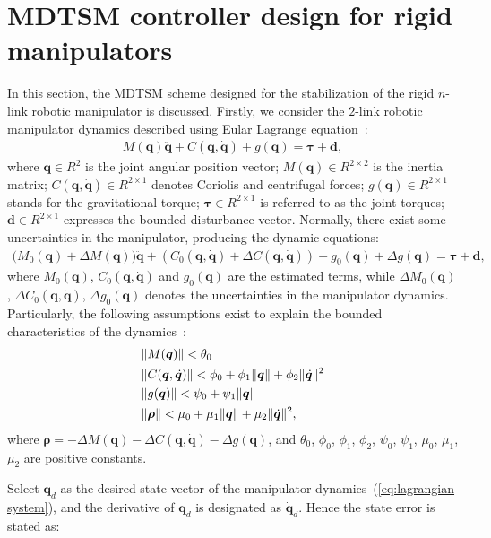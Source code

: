 \documentclass[3p]{elsarticle}
\theoremstyle{plain}
\theoremstyle{remark}
\begin{document}
\section{MDTSM controller design for rigid manipulators}\label{sec:3}
In this section, the MDTSM scheme designed for the stabilization of the rigid $n$-link robotic manipulator is discussed. Firstly, we consider the $2$-link robotic manipulator dynamics described using Eular Lagrange equation~\cite{feng2002non}:
\begin{align}
M(\bm q)\ddot {\bm q}+C(\bm q,\dot {\bm q})+g(\bm q)= \bm\tau+{\bm d},\label{eq:lagrangian system}
\end{align}
where $\bm q\in R^{2} $ is the joint angular position vector; ${M(\bm q)}\in R^{2\times 2}$ is the inertia matrix; ${C(\bm q,\dot{\bm q})}\in R^{2\times 1}$ denotes Coriolis and centrifugal forces; ${g(\bm q)}\in R^{2\times 1}$ stands for the gravitational torque; $\bm{\tau}\in R^{2\times 1}$ is referred to as the joint torques; $\bm d\in R^{2\times 1}$ expresses the bounded disturbance vector. Normally, there exist some uncertainties in the manipulator, producing the dynamic equations:
\begin{align}
(M_0(\bm q)+\Delta {M(\bm q))\ddot {\bm q}}+({C_0(\bm q,\dot {\bm q})+\Delta C(\bm q,\dot {\bm q})})+g_0(\bm q)+\Delta g(\bm q)=\bm {\tau}+\bm{d},
\end{align}
where $M_0(\bm q)$, $C_0(\bm q,\dot {\bm q})$ and $g_0(\bm q)$ are the estimated terms, while $\Delta M_0(\bm q)$, $\Delta C_0(\bm q,\dot {\bm q})$, $\Delta g_0(\bm q)$ denotes the uncertainties in the manipulator dynamics. Particularly, the following assumptions exist to explain the bounded characteristics of the dynamics~\cite{feng2002non}:
\begin{align}
&\Vert M(\bm q)\Vert< \theta_0\notag\\
&\Vert C(\bm q,\dot {\bm q})\Vert< \phi_0+\phi_1\Vert\bm q\Vert+\phi_2\Vert\dot{\bm q}\Vert^2\notag\\
&\Vert g(\bm q)\Vert< \psi_0+\psi_1\Vert\bm q\notag\Vert\\
&\Vert \bm {\rho}\Vert< \mu_0+\mu_1\Vert\bm q\Vert+\mu_2\Vert\dot{\bm q}\Vert^2,\label{eq:manipulator uncertainty}
\end{align}
where $\bm {\rho} = -\Delta M(\bm q)-\Delta C(\bm q,\dot {\bm q})-\Delta g(\bm q)$, and $\theta_0$, $\phi_0$, $\phi_1$, $\phi_2$, $\psi_0$, $\psi_1$, $\mu_0$, $\mu_1$, $\mu_2$ are positive constants.\par
Select $\bm q_d$ as the desired state vector of the manipulator dynamics~(\ref{eq:lagrangian system}), and the derivative of $\bm q_d$ is designated as $\dot {\bm q}_d$. Hence the state error is stated as:
\end{document}
